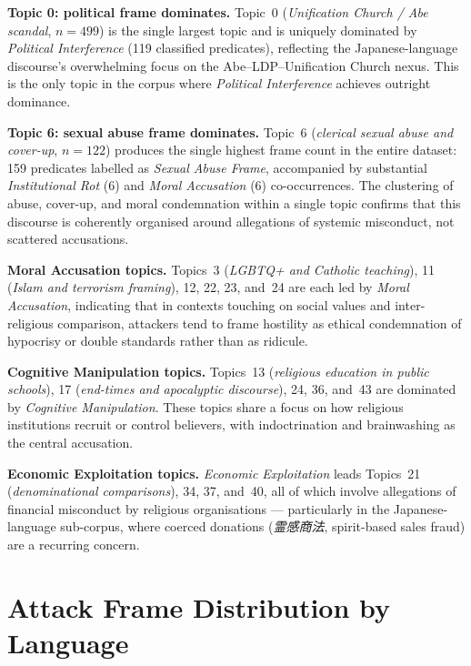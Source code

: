 \documentclass[../CLthesis.tex]{subfiles}
\begin{document}
\textbf{Topic 0: political frame dominates.}
Topic~0 (\textit{Unification Church / Abe scandal}, $n=499$) is the single largest topic and is uniquely dominated by \textit{Political Interference} (119 classified predicates), reflecting the Japanese-language discourse's overwhelming focus on the Abe--LDP--Unification Church nexus. This is the only topic in the corpus where \textit{Political Interference} achieves outright dominance.

\textbf{Topic 6: sexual abuse frame dominates.}
Topic~6 (\textit{clerical sexual abuse and cover-up}, $n=122$) produces the single highest frame count in the entire dataset: 159 predicates labelled as \textit{Sexual Abuse Frame}, accompanied by substantial \textit{Institutional Rot} (6) and \textit{Moral Accusation} (6) co-occurrences. The clustering of abuse, cover-up, and moral condemnation within a single topic confirms that this discourse is coherently organised around allegations of systemic misconduct, not scattered accusations.

\textbf{Moral Accusation topics.}
Topics~3 (\textit{LGBTQ+ and Catholic teaching}), 11 (\textit{Islam and terrorism framing}), 12, 22, 23, and~24 are each led by \textit{Moral Accusation}, indicating that in contexts touching on social values and inter-religious comparison, attackers tend to frame hostility as ethical condemnation of hypocrisy or double standards rather than as ridicule.

\textbf{Cognitive Manipulation topics.}
Topics~13 (\textit{religious education in public schools}), 17 (\textit{end-times and apocalyptic discourse}), 24, 36, and~43 are dominated by \textit{Cognitive Manipulation}. These topics share a focus on how religious institutions recruit or control believers, with indoctrination and brainwashing as the central accusation.

\textbf{Economic Exploitation topics.}
\textit{Economic Exploitation} leads Topics~21 (\textit{denominational comparisons}), 34, 37, and~40, all of which involve allegations of financial misconduct by religious organisations --- particularly in the Japanese-language sub-corpus, where coerced donations (\textit{霊感商法}, spirit-based sales fraud) are a recurring concern.

\section{Attack Frame Distribution by Language}
\label{sec:rq2-by-language}
\end{document}
